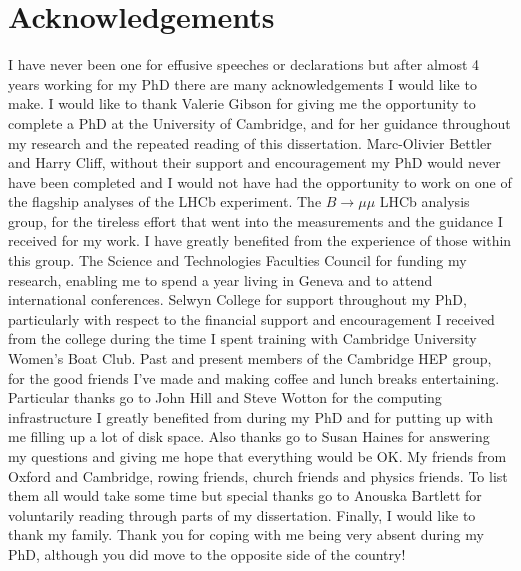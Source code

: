 




\chapter{Acknowledgements}

I have never been one for effusive speeches or declarations but after almost 4 years working for my PhD there are many acknowledgements I would like to make. %
I would like to thank Valerie Gibson for giving me the opportunity to complete a PhD at the University of Cambridge, and for her guidance throughout my research and the repeated reading of this dissertation. %
Marc-Olivier Bettler and Harry Cliff, without their support and encouragement my PhD would never have been completed and I would not have had the opportunity to work on one of the flagship analyses of the LHCb experiment.
The $B \to \mu\mu$ LHCb analysis group, for the tireless effort that went into the \BF measurements and the guidance I received for my work. I have greatly benefited from the experience of those within this group. 
The Science and Technologies Faculties Council for funding my research, enabling me to spend a year living in Geneva and to attend international conferences. Selwyn College for support throughout my PhD, particularly with respect to the financial support and encouragement I received from the college during the time I spent training with Cambridge University Women's Boat Club. %
Past and present members of the Cambridge HEP group, for the good friends I've made and making coffee and lunch breaks entertaining. Particular thanks go to John Hill and Steve Wotton for the computing infrastructure I greatly benefited from during my PhD and for putting up with me filling up a lot of disk space. Also thanks go to Susan Haines for answering my questions and giving me hope that everything would be OK. 
My friends from Oxford and Cambridge, rowing friends, church friends and physics friends. To list them all would take some time but special thanks go to Anouska Bartlett for voluntarily reading through parts of my dissertation. %
Finally, I would like to thank my family. Thank you for coping with me being very absent during my PhD, although you did move to the opposite side of the country! 

